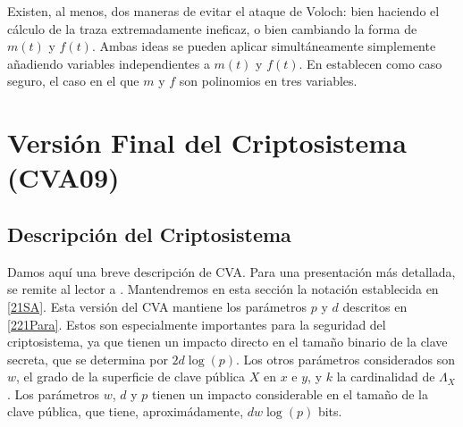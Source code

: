 \documentclass[11pt]{article}
\numberwithin{equation}{section} %
\numberwithin{figure}{section} %
\numberwithin{table}{section} %
\begin{document}
				Existen, al menos, dos maneras de evitar el ataque de Voloch: bien haciendo el c\'alculo de la traza extremadamente ineficaz, o bien cambiando la forma de $m(t)$ y $f(t)$. Ambas ideas se pueden aplicar simult\'aneamente simplemente añadiendo variables independientes a $m(t)$ y $f(t)$. En \cite{AGM09} establecen como caso seguro, el caso en el que $m$ y $f$ son polinomios en tres variables.


	\section{Versi\'on Final del Criptosistema (CVA09)}


		\subsection{Descripci\'on del Criptosistema}
		\label{41CVAFINAL}

			Damos aqu\'i una breve descripci\'on de CVA. Para una presentaci\'on m\'as detallada, se remite al lector a \cite{AGM09}. Mantendremos en esta secci\'on la notaci\'on establecida en \ref{21SA}. Esta versi\'on del CVA mantiene los par\'ametros $p$ y $d$ descritos en \ref{221Para}. Estos son especialmente importantes para la seguridad del criptosistema, ya que tienen un impacto directo en el tamaño binario de la clave secreta, que se determina por $2d\log(p)$. Los otros par\'ametros considerados son $w$, el grado de la superficie de clave p\'ublica $X$ en $x$ e $y$, y $k$ la cardinalidad de $\Lambda_X$. Los par\'ametros $w$, $d$ y $p$ tienen un impacto considerable en el tamaño de la clave p\'ublica, que tiene, aproxim\'adamente, $dw \log(p)$ bits.\\
		
\end{document}
